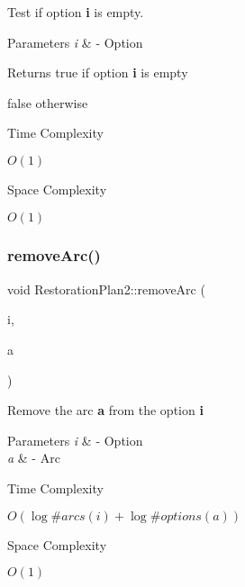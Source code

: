 Test if option {\bfseries i} is empty. 


\begin{DoxyParams}{Parameters}
{\em i} & -\/ Option \\
\hline
\end{DoxyParams}
\begin{DoxyReturn}{Returns}
true if option {\bfseries i} is empty 

false otherwise 
\end{DoxyReturn}
\begin{DoxyRefDesc}{Time Complexity}
\item[\hyperlink{time__time000026}{Time Complexity}]$O(1)$ \end{DoxyRefDesc}
\begin{DoxyRefDesc}{Space Complexity}
\item[\hyperlink{space__space000026}{Space Complexity}]$O(1)$ \end{DoxyRefDesc}
\mbox{\label{class_restoration_plan2_a20f26b0167d527be6d60614b4cba4dbf}} 
\subsubsection{\texorpdfstring{remove\+Arc()}{removeArc()}\hspace{0.1cm}{\footnotesize\ttfamily [1/2]}}
{\footnotesize\ttfamily void Restoration\+Plan2\+::remove\+Arc (\begin{DoxyParamCaption}\item[{\hyperlink{class_restoration_plan2_aff164a2726831342bf87af5e11df1064}{Option}}]{i,  }\item[{Graph\+\_\+t\+::\+Arc}]{a }\end{DoxyParamCaption})\hspace{0.3cm}{\ttfamily [inline]}}



Remove the arc {\bfseries a} from the option {\bfseries i} 


\begin{DoxyParams}{Parameters}
{\em i} & -\/ Option \\
\hline
{\em a} & -\/ Arc \\
\hline
\end{DoxyParams}
\begin{DoxyRefDesc}{Time Complexity}
\item[\hyperlink{time__time000016}{Time Complexity}]$O(\log \#arcs(i) + \log \#options(a))$ \end{DoxyRefDesc}
\begin{DoxyRefDesc}{Space Complexity}
\item[\hyperlink{space__space000016}{Space Complexity}]$O(1)$ \end{DoxyRefDesc}
\mbox{\label{class_restoration_plan2_aacd1be30356c999259bb98c2869bbb95}} 
